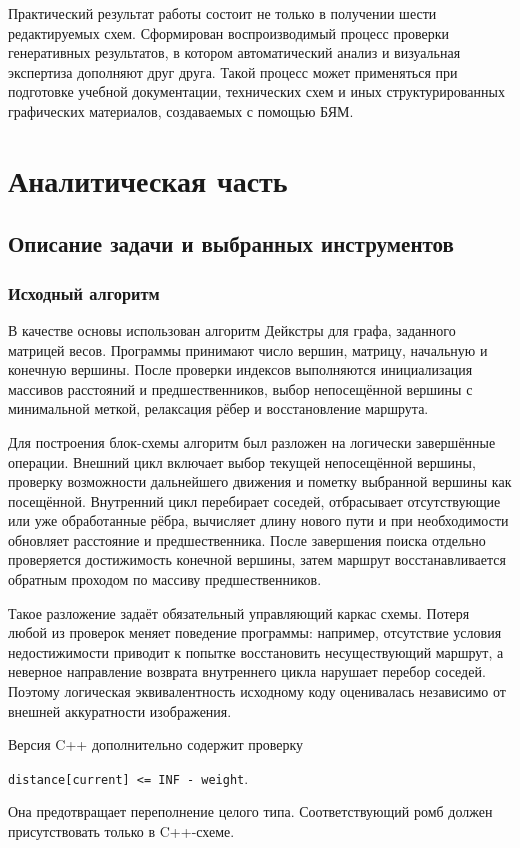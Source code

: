 \documentclass[a4paper,12pt]{extreport}
\newcommand{\code}[1]{\texttt{#1}}
\begin{document}
Практический результат работы состоит не только в получении шести редактируемых схем. Сформирован воспроизводимый процесс проверки генеративных результатов, в котором автоматический анализ и визуальная экспертиза дополняют друг друга. Такой процесс может применяться при подготовке учебной документации, технических схем и иных структурированных графических материалов, создаваемых с помощью БЯМ.

\chapter{Аналитическая часть}

\section{Описание задачи и выбранных инструментов}

\subsection{Исходный алгоритм}

В качестве основы использован алгоритм Дейкстры для графа, заданного матрицей весов. Программы принимают число вершин, матрицу, начальную и конечную вершины. После проверки индексов выполняются инициализация массивов расстояний и предшественников, выбор непосещённой вершины с минимальной меткой, релаксация рёбер и восстановление маршрута.

Для построения блок-схемы алгоритм был разложен на логически завершённые операции. Внешний цикл включает выбор текущей непосещённой вершины, проверку возможности дальнейшего движения и пометку выбранной вершины как посещённой. Внутренний цикл перебирает соседей, отбрасывает отсутствующие или уже обработанные рёбра, вычисляет длину нового пути и при необходимости обновляет расстояние и предшественника. После завершения поиска отдельно проверяется достижимость конечной вершины, затем маршрут восстанавливается обратным проходом по массиву предшественников.

Такое разложение задаёт обязательный управляющий каркас схемы. Потеря любой из проверок меняет поведение программы: например, отсутствие условия недостижимости приводит к попытке восстановить несуществующий маршрут, а неверное направление возврата внутреннего цикла нарушает перебор соседей. Поэтому логическая эквивалентность исходному коду оценивалась независимо от внешней аккуратности изображения.

Версия C++ дополнительно содержит проверку
\begin{center}
\code{distance[current] <= INF - weight}.
\end{center}
Она предотвращает переполнение целого типа. Соответствующий ромб должен присутствовать только в C++-схеме.
\end{document}
